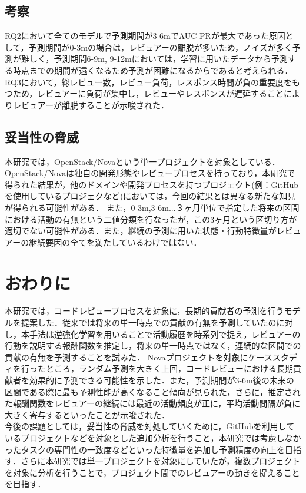 \documentclass[submit,techrep,noauthor]{ipsj}
\begin{document}
\subsection{考察}
RQ2において全てのモデルで予測期間が3-6mでAUC-PRが最大であった原因として，予測期間が0-3mの場合は，レビュアーの離脱が多いため，ノイズが多く予測が難しく，予測期間6-9m, 9-12mにおいては，学習に用いたデータから予測する時点までの期間が遠くなるため予測が困難になるからであると考えられる．RQ3において，総レビュー数，レビュー負荷，レスポンス時間が負の重要度をもつため，レビュアーに負荷が集中し，レビューやレスポンスが遅延することによりレビュアーが離脱することが示唆された．

\subsection{妥当性の脅威}
本研究では，OpenStack/Novaという単一プロジェクトを対象としている．OpenStack/Novaは独自の開発形態やレビュープロセスを持っており，本研究で得られた結果が，他のドメインや開発プロセスを持つプロジェクト(例：GitHubを使用しているプロジェクなど)においては，今回の結果とは異なる新たな知見が得られる可能性がある．
また，0-3m,3-6m...３ヶ月単位で指定した将来の区間における活動の有無という二値分類を行なったが，この3ヶ月という区切り方が適切でない可能性がある．また，継続の予測に用いた状態・行動特徴量がレビュアーの継続要因の全てを満たしているわけではない．

\section{おわりに}
\label{sec:conclusion}
本研究では，コードレビュープロセスを対象に，長期的貢献者の予測を行うモデルを提案した．従来では将来の単一時点での貢献の有無を予測していたのに対し，本手法は逆強化学習を用いることで活動履歴を時系列で捉え，レビュアーの行動を説明する報酬関数を推定し，将来の単一時点ではなく，連続的な区間での貢献の有無を予測することを試みた．
Novaプロジェクトを対象にケーススタディを行ったところ，ランダム予測を大きく上回，コードレビューにおける長期貢献者を効果的に予測できる可能性を示した．また，予測期間が3-6m後の未来の区間である際に最も予測性能が高くなること傾向が見られた，さらに，推定された報酬関数をレビュアーの継続には最近の活動頻度が正に，平均活動間隔が負に大きく寄与するといったことが示唆された．\\
 今後の課題としては，妥当性の脅威を対処していくために，GitHubを利用しているプロジェクトなどを対象とした追加分析を行うこと，本研究では考慮しなかったタスクの専門性の一致度などといった特徴量を追加し予測精度の向上を目指す．さらに本研究では単一プロジェクトを対象にしていたが，複数プロジェクトを対象に分析を行うことで，プロジェクト間でのレビュアーの動きを捉えることを目指す．




\end{document}
